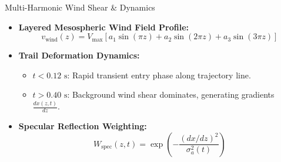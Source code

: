 \documentclass[aspectratio=169, 10pt]{beamer}
\begin{document}
\begin{frame}{Multi-Harmonic Wind Shear \& Dynamics}
    \begin{itemize}
        \item \textbf{Layered Mesospheric Wind Field Profile:}
        \begin{equation*}
            v_{\mathrm{wind}}(z) = V_{\mathrm{max}} \left[ a_1 \sin(\pi z) + a_2 \sin(2\pi z) + a_3 \sin(3\pi z) \right]
        \end{equation*}
        \item \textbf{Trail Deformation Dynamics:}
        \begin{itemize}
            \item $t < 0.12\text{ s}$: Rapid transient entry phase along trajectory line.
            \item $t > 0.40\text{ s}$: Background wind shear dominates, generating gradients $\frac{dx(z,t)}{dz}$.
        \end{itemize}
        \item \textbf{Specular Reflection Weighting:}
        \begin{equation*}
            W_{\mathrm{spec}}(z, t) = \exp\left( -\frac{(dx/dz)^2}{\sigma_a^2(t)} \right)
        \end{equation*}
    \end{itemize}
\end{frame}
\end{document}
